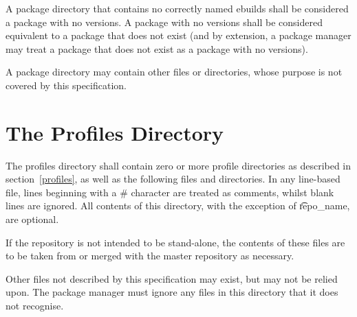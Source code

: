 A package directory that contains no correctly named ebuilds shall be considered a package with no
versions. A package with no versions shall be considered equivalent to a package that does not
exist (and by extension, a package manager may treat a package that does not exist as a package
with no versions).

A package directory may contain other files or directories, whose purpose is not covered by
this specification.

\section{The Profiles Directory}
\label{profiles-dir}

The profiles directory shall contain zero or more profile directories
as described in section~\ref{profiles}, as well as the following files
and directories. In any line-based file, lines beginning with a \#
character are treated as comments, whilst blank lines are ignored. All
contents of this directory, with the exception of \t{repo\_name}, are
optional.

If the repository is not intended to be stand-alone, the contents of these files are to be taken
from or merged with the master repository as necessary.

Other files not described by this specification may exist, but may not be relied upon. The package
manager must ignore any files in this directory that it does not recognise.

